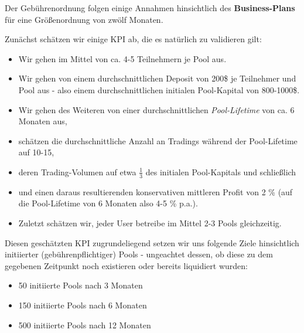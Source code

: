 \vspace{0.5cm}

Der Gebührenordnung folgen einige Annahmen hinsichtlich des \textbf{Business-Plans} für eine Größenordnung von zwölf Monaten.

\vspace{0.3cm}

\begin{Assumption}\label{bp}

Zunächst schätzen wir einige KPI ab, die es natürlich zu validieren gilt:

\begin{itemize}
	\item Wir gehen im Mittel von ca. 4-5 Teilnehmern je Pool aus.
	\item Wir gehen von einem durchschnittlichen Deposit von 200\$ je Teilnehmer und Pool aus - also einem durchschnittlichen initialen Pool-Kapital von 800-1000\$.
	\item Wir gehen des Weiteren von einer durchschnittlichen \textit{Pool-Lifetime} von ca. 6 Monaten aus,
	\item schätzen die durchschnittliche Anzahl an Tradings während der Pool-Lifetime auf 10-15,
	\item deren Trading-Volumen auf etwa $\frac{1}{3}$ des initialen Pool-Kapitals und schließlich 
	\item und einen daraus resultierenden konservativen mittleren Profit von 2 \% (auf die Pool-Lifetime von 6 Monaten also 4-5 \% p.a.).
	\item Zuletzt schätzen wir, jeder User betreibe im Mittel 2-3 Pools gleichzeitig.
\end{itemize}

\vspace{0.5cm}

Diesen geschätzten KPI zugrundeliegend setzen wir uns folgende Ziele hinsichtlich initiierter (gebührenpflichtiger) Pools - ungeachtet dessen, ob diese zu dem gegebenen Zeitpunkt noch existieren oder bereits liquidiert wurden:

\begin{itemize}
	\item 50 initiierte Pools nach 3 Monaten
	\item 150 initiierte Pools nach 6 Monaten
	\item 500 initiierte Pools nach 12 Monaten
\end{itemize}

\end{Assumption}

